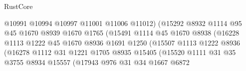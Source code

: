 \begin{lexlean}{RustCore}
\begin{coremodule}
                                        @10991
                                        @10994
                                        @10997
                                        @11001
                                        @11006
                                        @11012)
                                      (@15292
                                        @8932
                                        @1114
                                        @95
                                        @45
                                        @1670
                                        @8939
                                        @1670
                                        @1765
                                        (@15491
                                          @1114
                                          @45
                                          @1670
                                          @8938
                                          (@16228
                                            @1113
                                            @1222
                                            @45
                                            @1670
                                            @8936
                                            @1691
                                            @1250
                                            (@15507
                                              @1113
                                              @1222
                                              @8936
                                              (@16278
                                                @1112
                                                @31
                                                @1221
                                                @1705
                                                @8935
                                                @15405
                                                (@15520
                                                  @1111
                                                  @31
                                                  @35
                                                  @3755
                                                  @8934
                                                  @15557
                                                  (@17943
                                                    @976
                                                    @31
                                                    @34
                                                    @1667
                                                    @6872

\end{coremodule}
\end{lexlean}
